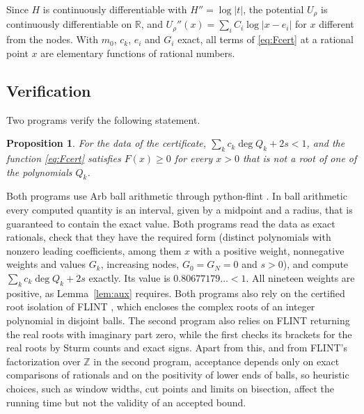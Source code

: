 \documentclass[11pt]{amsart}
\newtheorem{proposition}[theorem]{Proposition}
\theoremstyle{remark}
\numberwithin{equation}{section}
\newcommand{\R}{\mathbb{R}}
\newcommand{\Z}{\mathbb{Z}}
\newcommand{\Budget}{0.80677179}
\begin{document}
Since $H$ is continuously differentiable with $H''=\log|t|$, the potential $U_\rho$ is continuously differentiable on $\R$, and $U_\rho''(x)=\sum_iC_i\log|x-e_i|$ for $x$ different from the nodes. With $m_0$, $c_k$, $e_i$ and $G_i$ exact, all terms of \eqref{eq:Fcert} at a rational point $x$ are elementary functions of rational numbers.

\subsection{Verification}
Two programs verify the following statement.

\begin{proposition}\label{prop:check}
For the data of the certificate, $\sum_kc_k\deg Q_k+2s<1$, and the function \eqref{eq:Fcert} satisfies $F(x)\ge0$ for every $x>0$ that is not a root of one of the polynomials $Q_k$.
\end{proposition}

Both programs use Arb ball arithmetic \cite{Joh17} through python-flint \cite{pyflint}. In ball arithmetic every computed quantity is an interval, given by a midpoint and a radius, that is guaranteed to contain the exact value. Both programs read the data as exact rationals, check that they have the required form (distinct polynomials with nonzero leading coefficients, among them $x$ with a positive weight, nonnegative weights and values $G_k$, increasing nodes, $G_0=G_N=0$ and $s>0$), and compute $\sum_kc_k\deg Q_k+2s$ exactly. Its value is $\Budget\ldots<1$. All nineteen weights are positive, as Lemma~\ref{lem:aux} requires. Both programs also rely on the certified root isolation of FLINT \cite{FLINT}, which encloses the complex roots of an integer polynomial in disjoint balls. The second program also relies on FLINT returning the real roots with imaginary part zero, while the first checks its brackets for the real roots by Sturm counts and exact signs. Apart from this, and from FLINT's factorization over $\Z$ in the second program, acceptance depends only on exact comparisons of rationals and on the positivity of lower ends of balls, so heuristic choices, such as window widths, cut points and limits on bisection, affect the running time but not the validity of an accepted bound.
\end{document}
